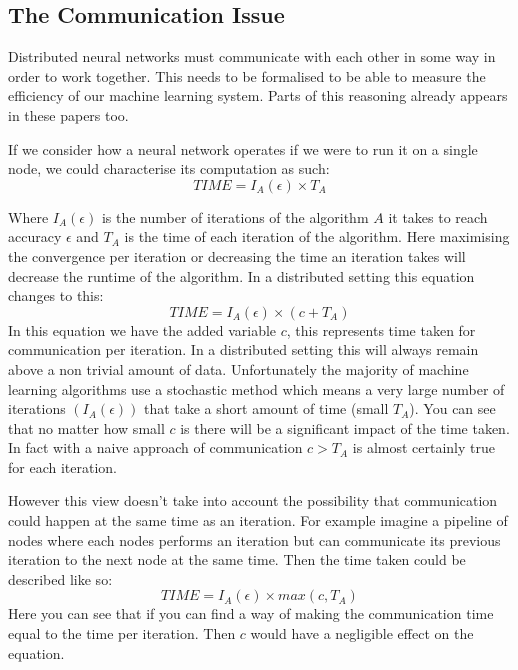 \subsection{The Communication Issue}


Distributed neural networks must communicate with each other in some way in
order to work together. This needs to be formalised to be able to measure the
efficiency of our machine learning system. Parts of this reasoning already
appears in these papers too. \cite{konevcny2016federated ,Ma2017DistributedOptimisation}

If we consider how a neural network operates if we were to run it on a single
node, we could characterise its computation as such:
\begin{equation}
    TIME = I_A (\epsilon) \times T_A 
\end{equation}

Where \(I_A(\epsilon)\) is the number of iterations of the algorithm \(A\) it
takes to reach accuracy \(\epsilon\) and \(T_A\) is the time of each iteration
of the algorithm. Here maximising the convergence per iteration or decreasing
the time an iteration takes will decrease the runtime of the algorithm. In a
distributed setting this equation changes to this:
\begin{equation}
    TIME = I_A (\epsilon) \times (c + T_A)  
\end{equation}
In this equation we have the added variable \(c\), this represents time taken
for communication per iteration. In a distributed setting this will always
remain above a non trivial amount of data. Unfortunately the majority of machine
learning algorithms use a stochastic method which means a very large number of
iterations \((I_A(\epsilon))\) that take a short amount of time (small \(T_A\)).
You can see that no matter how small \(c\) is there will be a significant impact
of the time taken. In fact with a naive approach of communication \(c > T_A\) is
almost certainly true for each iteration.

However this view doesn't take into account the possibility that communication
could happen at the same time as an iteration. For example imagine a pipeline of
nodes where each nodes performs an iteration but can communicate its previous
iteration to the next node at the same time. Then the time taken could be
described like so:
\begin{equation}
    TIME = I_A (\epsilon) \times max(c, T_A)
\end{equation}
Here you can see that if you can find a way of making the communication time
equal to the time per iteration. Then \(c\) would have a negligible effect on
the equation.


